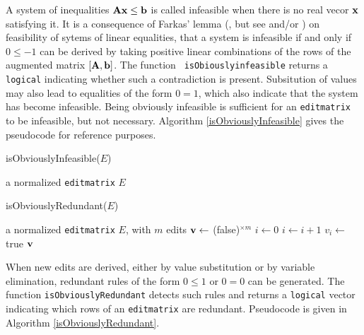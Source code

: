 \documentclass[10pt, fleqn, a4paper]{article}
\begin{document}
A system of inequalities $\bf Ax\leq b$ is called infeasible when there is no
real vecor $\bf x$ satisfying it. It is a consequence of Farkas' lemma
(\cite{farkas:1902}, but see \cite{schrijver:1998} and/or \cite{kuhn:1956}) on
feasibility of sytems of linear equalities, that  a system is infeasible if and
only if $0\leq -1$ can be derived by taking positive linear combinations of the
rows of the augmented matrix $[{\bf A},{\bf b}]$. The function {\tt
isObiouslyinfeasible} returns a {\tt logical} indicating whether such a
contradiction is present. Subsitution of values may also lead to equalities of
the form $0=1$, which also indicate that the system has become infeasible.
Being obviously infeasible is sufficient for an {\tt editmatrix} to be
infeasible, but not necessary. Algorithm \ref{isObviouslyInfeasible} gives the
pseudocode for reference purposes.
%
\begin{algorithm}
\caption{{\sc isObviouslyInfeasible($E$)}}
\label{isObviouslyInfeasible}
\begin{algorithmic}
\Require a normalized {\tt editmatrix} $E$
    \State {}
  \EndIf
 \EndIf
\EndFor
\State{}
\Ensure {}
\end{algorithmic}
\end{algorithm}
%
\begin{algorithm}
\caption{{\sc isObviouslyRedundant($E$)}}
\label{isObviouslyRedundant}
\begin{algorithmic}
\Require a normalized {\tt editmatrix} $E$, with $m$ edits
\State  ${\bf v} \leftarrow$ ({\sc false})$^{\times{m}}$
\State $i\leftarrow 0$
\State $i\leftarrow i+1$
    \State $v_i\leftarrow${\sc true}
  \EndIf
 \EndIf
\EndFor
\Ensure ${\bf v}$ 
\end{algorithmic}
\end{algorithm}

When new edits are derived, either by value substitution or by variable elimination,
redundant rules of the form $0 \leq 1$ or $0=0$ can be generated. The function {\tt isObviouslyRedundant}
detects such rules and returns a {\tt logical} vector indicating which rows of an {\tt editmatrix}
are redundant. Pseudocode is given in Algorithm \ref{isObviouslyRedundant}.
\end{document}
